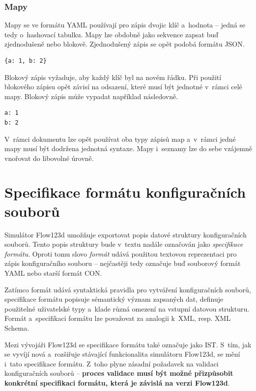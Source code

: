 \documentclass[FM,bw,DP]{tulthesis}
\begin{document}
\subsubsection*{Mapy}

Mapy se ve formátu \gls{YAML} používají pro zápis dvojic klíč a~hodnota -- jedná se tedy o~hashovací tabulku. Mapy lze obdobně jako sekvence zapsat buď zjednodušeně nebo blokově. Zjednodušený zápis se opět podobá formátu \gls{JSON}.

\vspace{5pt}
\begin{lstlisting}
{a: 1, b: 2}
\end{lstlisting}
\vspace*{-20pt}

Blokový zápis vyžaduje, aby každý klíč byl na novém řádku. Při použití blokového zápisu opět závisí na odsazení, které musí být jednotné v~rámci celé mapy. Blokový zápis může vypadat například následovně.

\vspace{5pt}
\begin{lstlisting}
a: 1
b: 2
\end{lstlisting}
\vspace*{-20pt}

V~rámci dokumentu lze opět používat oba typy zápisů map a~v~rámci jedné mapy musí být dodržena jednotná syntaxe. Mapy i~seznamy lze do sebe vzájemně vnořovat do libovolné úrovně.

\section{Specifikace formátu konfiguračních souborů}

Simulátor Flow123d umožňuje exportovat popis datové struktury konfiguračních souborů. Tento popis struktury bude v~textu nadále označován jako \textit{specifikace formátu}. Oproti tomu slovo \textit{formát} udává použitou textovou reprezentaci pro zápis konfiguračního souboru -- nejčastěji tedy označuje buď souborový formát \gls{YAML} nebo starší formát \gls{CON}.

Zatímco formát udává syntaktická pravidla pro vytváření konfiguračních souborů, specifikace formátu popisuje sémantický význam zapsaných dat, definuje použitelné uživatelské typy a~klade různá omezení na vstupní datovou strukturu. Formát a~specifikaci formátu lze považovat za analogii k~\gls{XML}, resp. \gls{XML} Schema.

Mezi vývojáři Flow123d se specifikace formátu také označuje jako \gls{IST}. S~tím, jak se vyvíjí nová a~rozšiřuje stávající funkcionalita simulátoru Flow123d, se mění i~tato specifikace formátu. Z~toho plyne zásadní požadavek na validaci konfiguračních souborů -- \textbf{proces validace musí být možné přizpůsobit konkrétní specifikaci formátu, která je závislá na verzi Flow123d}.
\end{document}
